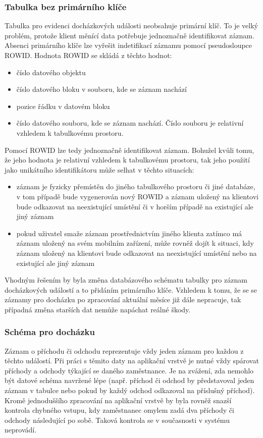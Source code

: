 \documentclass{diplomka}
\begin{document}
\subsubsection*{Tabulka bez primárního klíče}
Tabulka pro evidenci docházkových události neobsahuje primární klíč. To je velký problém, protože klient měnící data potřebuje jednoznačně identifikovat záznam. Absenci primárního klíče lze vyřešit indetifikací záznamu pomocí pseudosloupce ROWID. Hodnota ROWID se skládá z těchto hodnot:
\begin{itemize}[noitemsep,nolistsep]
\item číslo datového objektu 
\item číslo datového bloku v souboru, kde se záznam nachází
\item pozice řádku v datovém bloku 
\item číslo datového souboru, kde se záznam nachází. Číslo souboru je relativní vzhledem k tabulkovému prostoru.
\end{itemize}
Pomocí ROWID lze tedy jednoznačně identifikovat záznam. Bohužel kvůli tomu, že jeho hodnota je relativní vzhledem k tabulkovému prostoru, tak jeho použití jako unikátního identifikátoru může selhat v těchto situacích:
\begin{itemize}[noitemsep,nolistsep]
\item záznam je fyzicky přemístěn do jiného tabulkového prostoru či jiné databáze, v tom případě bude vygenerován nový ROWID a záznam uložený na klientovi bude odkazovat na neexistující umístění či v horším případě na existující ale jiný záznam
\item pokud uživatel smaže záznam prostřednictvím jiného klienta zatímco má záznam uložený na svém mobilním zařízení, může rovněž dojít k situaci, kdy záznam uložený na klientovi bude odkazovat na neexistující umístění nebo na existující ale jiný záznam 
\end{itemize}

Vhodným řešením by byla změna databázového schématu tabulky pro záznam docházkových událostí a to přidáním primárního klíče. Vzhledem k tomu, že se se záznamy pro docházku po zpracování aktuální měsíce již dále nepracuje, tak případná změna starších dat nemůže napáchat reálné škody. 
\subsubsection*{Schéma pro docházku}
Záznam o příchodu či odchodu reprezentuje vždy jeden záznam pro každou z těchto událostí. Při práci s těmito daty na aplikační vrstvě je nutné vždy spárovat příchody a odchody týkající se daného zaměstnance. Je na zvážení, zda nemohlo být datové schéma navržené lépe (např. příchod či odchod by představoval jeden záznam v tabulce nebo pokud by každý odchod odkazoval na příslušný příchod). Kromě jednoduššího zpracování na aplikační vrstvě by byla rovněž snazší kontrola chybného vstupu, kdy zaměstnanec omylem zadá dva příchody či odchody následující po sobě. Taková kontrola se v současnosti v systému neprovádí.
\end{document}
